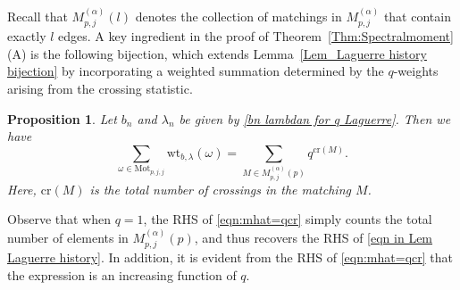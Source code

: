 \documentclass{amsart}
\newcommand{\Cr}{\mathrm{cr}}
\theoremstyle{plain}
\newtheorem{prop}[thm]{Proposition}
\theoremstyle{remark}
\numberwithin{equation}{section}
\begin{document}
Recall that $M_{p,j}^{(\alpha)}(l)$ denotes the collection of matchings in $M_{p,j}^{(\alpha)}$ that contain exactly $l$ edges.  
A key ingredient in the proof of Theorem~\ref{Thm:Spectralmoment} (A) is the following bijection, which extends Lemma~\ref{Lem_Laguerre history bijection} by incorporating a weighted summation determined by the $q$-weights arising from the crossing statistic.

\begin{prop} \label{Prop_m har q cr stat}
Let $b_n$ and $\lambda_n$ be given by \eqref{bn lambdan for q Laguerre}. Then we have 
    \begin{equation}\label{eqn:mhat=qcr}
    \sum_{\omega\in\mathrm{Mot}_{p,j,j}}\mathrm{wt}_{b,\lambda}(\omega) = \sum_{M\in M_{p,j}^{(\alpha)}(p)}q^{\Cr(M)}.
    \end{equation}
Here, $\Cr(M)$ is the total number of crossings in the matching $M$.
\end{prop}

Observe that when $q=1$, the RHS of \eqref{eqn:mhat=qcr} simply counts the total number of elements in $M_{p,j}^{(\alpha)}(p)$, and thus recovers the RHS of \eqref{eqn in Lem Laguerre history}. In addition, it is evident from the RHS of \eqref{eqn:mhat=qcr} that the expression is an increasing function of $q$.
\end{document}
